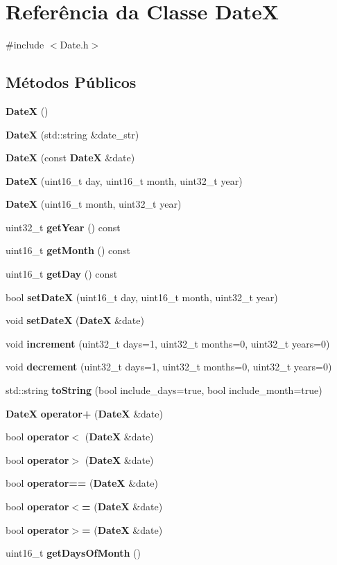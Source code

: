 \section{Referência da Classe DateX}
\label{class_date_x}


{\ttfamily \#include $<$Date.\+h$>$}

\subsection*{Métodos Públicos}
\begin{DoxyCompactItemize}
\item 
{\bf DateX} ()
\item 
{\bf DateX} (std\+::string \&date\+\_\+str)
\item 
{\bf DateX} (const {\bf DateX} \&date)
\item 
{\bf DateX} (uint16\+\_\+t day, uint16\+\_\+t month, uint32\+\_\+t year)
\item 
{\bf DateX} (uint16\+\_\+t month, uint32\+\_\+t year)
\item 
uint32\+\_\+t {\bf get\+Year} () const 
\item 
uint16\+\_\+t {\bf get\+Month} () const 
\item 
uint16\+\_\+t {\bf get\+Day} () const 
\item 
bool {\bf set\+DateX} (uint16\+\_\+t day, uint16\+\_\+t month, uint32\+\_\+t year)
\item 
void {\bf set\+DateX} ({\bf DateX} \&date)
\item 
void {\bf increment} (uint32\+\_\+t days=1, uint32\+\_\+t months=0, uint32\+\_\+t years=0)
\item 
void {\bf decrement} (uint32\+\_\+t days=1, uint32\+\_\+t months=0, uint32\+\_\+t years=0)
\item 
std\+::string {\bf to\+String} (bool include\+\_\+days=true, bool include\+\_\+month=true)
\item 
{\bf DateX} {\bf operator+} ({\bf DateX} \&date)
\item 
bool {\bf operator$<$} ({\bf DateX} \&date)
\item 
bool {\bf operator$>$} ({\bf DateX} \&date)
\item 
bool {\bf operator==} ({\bf DateX} \&date)
\item 
bool {\bf operator$<$=} ({\bf DateX} \&date)
\item 
bool {\bf operator$>$=} ({\bf DateX} \&date)
\item 
uint16\+\_\+t {\bf get\+Days\+Of\+Month} ()
\end{DoxyCompactItemize}
